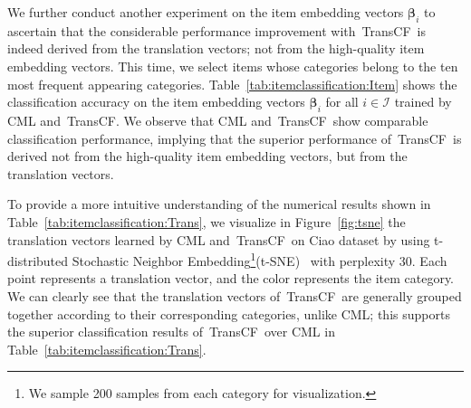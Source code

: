 \documentclass[conference]{IEEEtran}
\newcommand{\propose}{\textsf{{TransCF}}}
\begin{document}
We further conduct another experiment on the item embedding vectors $\bm{\beta}_i$ to ascertain that the considerable performance improvement with~\propose~is indeed derived from the translation vectors; not from the high-quality item embedding vectors. This time, we select items whose categories belong to the ten most frequent appearing categories. Table~\ref{tab:itemclassification:Item} shows the classification accuracy on the item embedding vectors $\bm{\beta}_i$ for all $i\in\mathcal{I}$ trained by CML and~\propose. We observe that CML and~\propose~show comparable classification performance, implying that the superior performance of~\propose~is derived not from the high-quality item embedding vectors, but from the translation vectors.

To provide a more intuitive understanding of the numerical results shown in Table~\ref{tab:itemclassification:Trans}, we visualize in Figure~\ref{fig:tsne} the translation vectors learned by CML and~\propose~on Ciao dataset by using t-distributed Stochastic Neighbor Embedding\footnote{We sample 200 samples from each category for visualization.}(t-SNE)~\cite{maaten2008visualizing} with perplexity 30. Each point represents a translation vector, and the color represents the item category. We can clearly see that the translation vectors of~\propose~are generally grouped together according to their corresponding categories, unlike CML; this supports the superior classification results of~\propose~over CML in Table~\ref{tab:itemclassification:Trans}.
\end{document}
